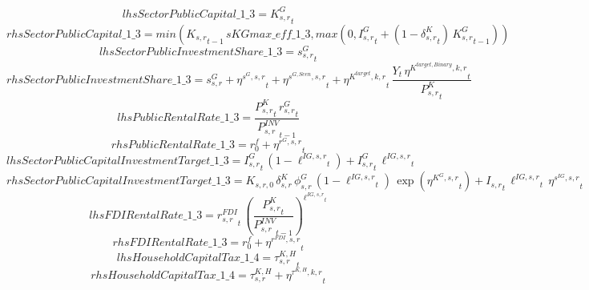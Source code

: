\begin{dmath*}
lhsSectorPublicCapital\_1\_3 = {{K^G_{s,r}}}_{t}
\end{dmath*}
\begin{dmath*}
rhsSectorPublicCapital\_1\_3 = min({{K_{s,r}}}_{t-1}\, {sKGmax\_eff\_1\_3},max(0,{{I^G_{s,r}}}_{t}+\left(1-{{\delta^{K}_{s,r}}}_{t}\right)\, {{K^G_{s,r}}}_{t-1}))
\end{dmath*}
\begin{dmath*}
lhsSectorPublicInvestmentShare\_1\_3 = {{s^G_{s,r}}}_{t}
\end{dmath*}
\begin{dmath*}
rhsSectorPublicInvestmentShare\_1\_3 = {{s^{G}_{s,r}}}+{{\eta^{s^G,s,r}}}_{t}+{{\eta^{s^{G,Scen},s,r}}}_{t}+{{\eta^{K^{target},k,r}}}_{t}\, \frac{{Y}_{t}\, {{\eta^{K^{target,Binary},k,r}}}_{t}}{{{P^K_{s,r}}}_{t}}
\end{dmath*}
\begin{dmath*}
lhsPublicRentalRate\_1\_3 = \frac{{{P^K_{s,r}}}_{t}\, {{r^G_{s,r}}}_{t}}{{{P^{INV}_{s,r}}}_{t-1}}
\end{dmath*}
\begin{dmath*}
rhsPublicRentalRate\_1\_3 = {{r^f_0}}+{{\eta^{r^G,s,r}}}_{t}
\end{dmath*}
\begin{dmath*}
lhsSectorPublicCapitalInvestmentTarget\_1\_3 = {{I^G_{s,r}}}_{t}\, \left(1-{{\ell^{IG,s,r}}}_{t}\right)+{{I^G_{s,r}}}_{t}\, {{\ell^{IG,s,r}}}_{t}
\end{dmath*}
\begin{dmath*}
rhsSectorPublicCapitalInvestmentTarget\_1\_3 = {{K_{s,r,0}}}\, {{\delta^{K}_{s,r}}}\, {{\phi^{G}_{s,r}}}\, \left(1-{{\ell^{IG,s,r}}}_{t}\right)\, \exp\left({{\eta^{K^G,s,r}}}_{t}\right)+{{I_{s,r}}}_{t}\, {{\ell^{IG,s,r}}}_{t}\, {{\eta^{s^{IG},s,r}}}_{t}
\end{dmath*}
\begin{dmath*}
lhsFDIRentalRate\_1\_3 = {{r^{FDI}_{s,r}}}_{t}\, \left(\frac{{{P^K_{s,r}}}_{t}}{{{P^{INV}_{s,r}}}_{t-1}}\right)^{{{\ell^{IG,s,r}}}_{t}}
\end{dmath*}
\begin{dmath*}
rhsFDIRentalRate\_1\_3 = {{r^f_0}}+{{\eta^{r^{FDI},s,r}}}_{t}
\end{dmath*}
\begin{dmath*}
lhsHouseholdCapitalTax\_1\_4 = {{\tau^{K,H}_{s,r}}}_{t}
\end{dmath*}
\begin{dmath*}
rhsHouseholdCapitalTax\_1\_4 = {{\tau^{K,H}_{s,r}}}+{{\eta^{\tau^{K,H},k,r}}}_{t}
\end{dmath*}
